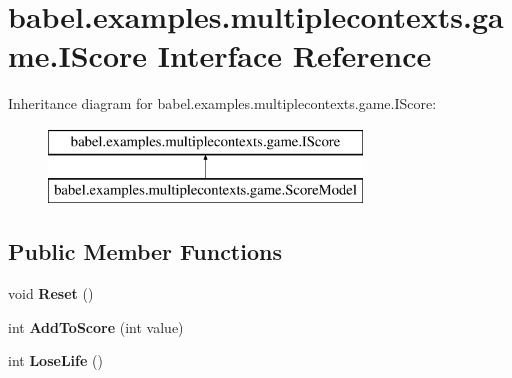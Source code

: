 \hypertarget{interfacebabel_1_1examples_1_1multiplecontexts_1_1game_1_1_i_score}{\section{babel.\-examples.\-multiplecontexts.\-game.\-I\-Score Interface Reference}
\label{interfacebabel_1_1examples_1_1multiplecontexts_1_1game_1_1_i_score}
}
Inheritance diagram for babel.\-examples.\-multiplecontexts.\-game.\-I\-Score\-:\begin{figure}[H]
\begin{center}
\leavevmode
\includegraphics[height=2.000000cm]{interfacebabel_1_1examples_1_1multiplecontexts_1_1game_1_1_i_score}
\end{center}
\end{figure}
\subsection*{Public Member Functions}
\begin{DoxyCompactItemize}
\item 
\hypertarget{interfacebabel_1_1examples_1_1multiplecontexts_1_1game_1_1_i_score_a68cae2099b8e4fbb32563a197b1b6387}{void {\bfseries Reset} ()}\label{interfacebabel_1_1examples_1_1multiplecontexts_1_1game_1_1_i_score_a68cae2099b8e4fbb32563a197b1b6387}

\item 
\hypertarget{interfacebabel_1_1examples_1_1multiplecontexts_1_1game_1_1_i_score_a49aecdb8fc672520fa4d73cdcc7f67c5}{int {\bfseries Add\-To\-Score} (int value)}\label{interfacebabel_1_1examples_1_1multiplecontexts_1_1game_1_1_i_score_a49aecdb8fc672520fa4d73cdcc7f67c5}

\item 
\hypertarget{interfacebabel_1_1examples_1_1multiplecontexts_1_1game_1_1_i_score_a978640eb44c0935925e1d303d0900ad1}{int {\bfseries Lose\-Life} ()}\label{interfacebabel_1_1examples_1_1multiplecontexts_1_1game_1_1_i_score_a978640eb44c0935925e1d303d0900ad1}

\end{DoxyCompactItemize}

